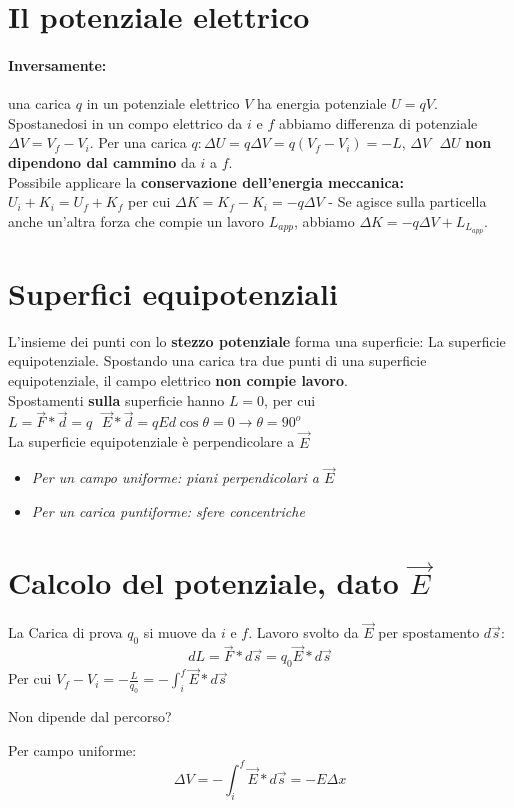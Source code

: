 \section{Il potenziale elettrico}
\paragraph{Inversamente:} una carica $q$ in un potenziale elettrico $V$ ha energia potenziale $U=qV$. Spostanedosi in un compo elettrico da $i$ e $f$ abbiamo differenza di potenziale $\Delta V=V_f-V_i$. Per una carica $q: \Delta U=q\Delta V=q(V_f-V_i)=-L$, $\Delta V \text{ } \Delta U$ \textbf{non dipendono dal cammino} da $i$ a $f$.\\
Possibile applicare la \textbf{conservazione dell'energia meccanica: } $U_i+K_i=U_f+K_f$ per cui $\Delta K=K_f-K_i=-q\Delta V$ - Se agisce sulla particella anche un'altra forza che compie un lavoro $L_{app}$, abbiamo $\Delta K=-q\Delta V+L_{L_{app}}$.
\section{Superfici equipotenziali}
L'insieme dei punti con lo \textbf{stezzo potenziale} forma una superficie: La superficie equipotenziale. Spostando una carica tra due punti di una superficie equipotenziale, il campo elettrico \textbf{non compie lavoro}.\\
Spostamenti \textbf{sulla} superficie hanno $L=0$, per cui $L=\vec{F}*\vec{d}=q \text{ } \vec{E}*\vec{d}=qEd\cos\theta=0\to \theta =90^o$\\
La superficie equipotenziale è perpendicolare a $\vec{E}$
\begin{itemize}
\item \textit{Per un campo uniforme: piani perpendicolari a $\vec{E}$}
\item \textit{Per un carica puntiforme: sfere concentriche}
\end{itemize}
\section {Calcolo del potenziale, dato $\vec{E}$}
La Carica di prova $q_0$ si muove da $i$ e $f$. Lavoro svolto da $\vec{E}$ per spostamento $d\vec{s}$:
\begin{equation}
	dL=\vec{F}*d\vec{s}=q_0\vec{E}*d\vec{s}
\end{equation}
Per cui $V_f-V_i=-\frac{L}{q_0}=-\int^f_i \vec{E}*d\vec{s}$
\begin{center}
	Non dipende dal percorso?
\end{center}
Per campo uniforme:
\begin{equation}
  \Delta V=-\int_i^f \vec{E}*d\vec{s}=-E\Delta x
\end{equation}
